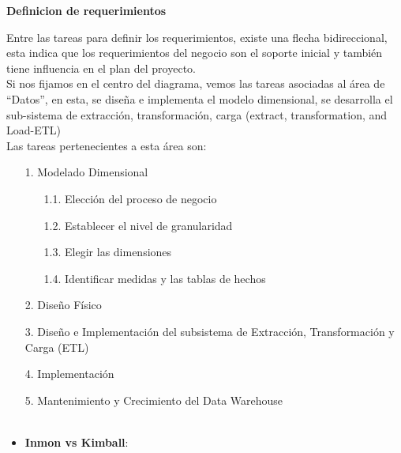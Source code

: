 \documentclass[twoside,twocolumn]{article}
\begin{document}
\begin{enumerate}
\textbf{Definicion de requerimientos}

Entre las tareas para definir los requerimientos, existe una flecha bidireccional, esta indica que los requerimientos del negocio son el soporte inicial y también tiene influencia en el plan del proyecto.\\

Si nos fijamos en el centro del diagrama, vemos las tareas asociadas al área de “Datos”, en esta, se diseña e implementa el modelo dimensional, se desarrolla el sub-sistema de extracción, transformación, carga (extract, transformation, and Load-ETL) \\

Las tareas pertenecientes a esta área son:

\begin{itemize}
\item [1.] Modelado Dimensional
\begin{itemize}
\item [1.1.] Elección del proceso de negocio
\item [1.2.] Establecer el nivel de granularidad
\item [1.3.] Elegir las dimensiones
\item [1.4.] Identificar medidas y las tablas de hechos
\end{itemize}
\item [2.] Diseño Físico
\item [3.] Diseño e Implementación del subsistema de Extracción, Transformación y Carga (ETL)
\item [4.] Implementación
\item [5.] Mantenimiento y Crecimiento del Data Warehouse
\textbf{}\\
\textbf{}\\
\item \textbf{Inmon vs Kimball}: \\


\end{itemize}
\end{enumerate}
\end{document}
